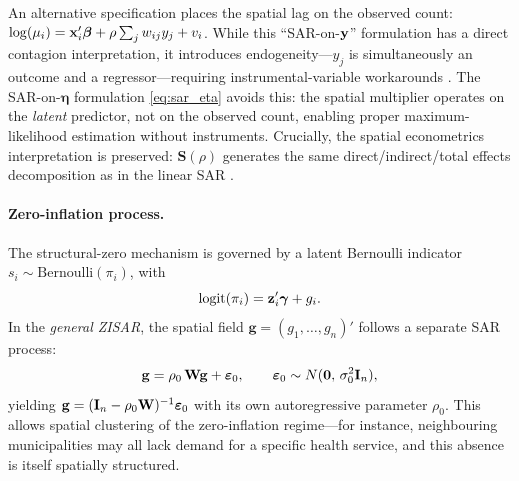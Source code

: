 \begin{remark}\label{rem:sar_eta_vs_y}
An alternative specification places the spatial lag on the observed count: $\log(\mu_i) = \mathbf{x}_i'\boldsymbol{\beta} + \rho\sum_j w_{ij}y_j + v_i$.
While this ``SAR-on-$\mathbf{y}$'' formulation has a direct contagion interpretation, it introduces endogeneity---$y_j$ is simultaneously an outcome and a regressor---requiring instrumental-variable workarounds \citep{lambert2010}.
The SAR-on-$\boldsymbol{\eta}$ formulation \eqref{eq:sar_eta} avoids this: the spatial multiplier operates on the \emph{latent} predictor, not on the observed count, enabling proper maximum-likelihood estimation without instruments.
Crucially, the spatial econometrics interpretation is preserved: $\mathbf{S}(\rho)$ generates the same direct/indirect/total effects decomposition as in the linear SAR \citep{lesage_pace2009}.
\end{remark}

\paragraph{Zero-inflation process.}
The structural-zero mechanism is governed by a latent Bernoulli indicator $s_i \sim \text{Bernoulli}(\pi_i)$, with
\begin{equation}\label{eq:zeroinfl_general}
  \operatorname{logit}(\pi_i) = \mathbf{z}_i'\boldsymbol{\gamma} + g_i.
\end{equation}
In the \emph{general ZISAR}, the spatial field $\mathbf{g} = (g_1,\ldots,g_n)'$ follows a separate SAR process:
\begin{equation}\label{eq:sar_g}
  \mathbf{g} = \rho_0\,\mathbf{W}\mathbf{g} + \boldsymbol{\varepsilon}_0, \qquad \boldsymbol{\varepsilon}_0 \sim N(\mathbf{0},\,\sigma_0^2\mathbf{I}_n),
\end{equation}
yielding $\mathbf{g} = (\mathbf{I}_n - \rho_0\mathbf{W})^{-1}\boldsymbol{\varepsilon}_0$ with its own autoregressive parameter $\rho_0$.
This allows spatial clustering of the zero-inflation regime---for instance, neighbouring municipalities may all lack demand for a specific health service, and this absence is itself spatially structured.


